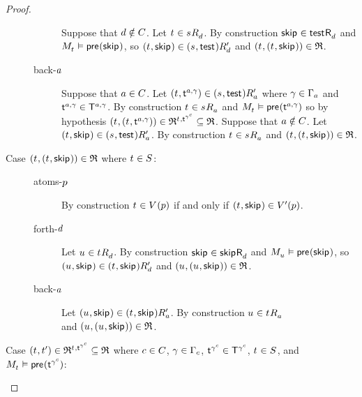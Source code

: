 \begin{proof}
\begin{description}
\begin{description}
                Suppose that $\agentD \notin \agentsC$.
                Let $\kStateT \in \kSuccessorsD{\kStateS}$.
                By construction $\aStateSkip \in \aSuccessorsD{\aStateTest}$ and $\kPModel{\kStateT} \entails \aPrecondition(\aStateSkip)$, so $(\kStateT, \aStateSkip) \in \kSuccessorsPD{(\kStateS, \aStateTest)}$ and $(\kStateT, (\kStateT, \aStateSkip)) \in \refinement$.
            \item[back-$\agentA$]
                Suppose that $\agentA \in \agentsC$.
                Let $(\kStateT, \aStateT[\agentA, \gamma]) \in \kSuccessorsPA{(\kStateS, \aStateTest)}$ where $\gamma \in \Gamma_\agentA$ and $\aStateT[\agentA, \gamma] \in \aStatesT[\agentA, \gamma]$.
                By construction $\kStateT \in \kSuccessorsA{\kStateS}$ and $\kPModel{\kStateT} \entails \aPrecondition(\aStateT[\agentA, \gamma])$ so by hypothesis $(\kStateT, (\kStateT, \aStateT[\agentA, \gamma])) \in \refinement^{\kStateT, \aStateT[\gamma^\agentC]} \subseteq \refinement$.
                Suppose that $\agentA \notin \agentsC$.
                Let $(\kStateT, \aStateSkip) \in \kSuccessorsPA{(\kStateS, \aStateTest)}$.
                By construction $\kStateT \in \kSuccessorsA{\kStateS}$ and $(\kStateT, (\kStateT, \aStateSkip)) \in \refinement$.
        \end{description}
    \item[{Case $(\kStateT, (\kStateT, \aStateSkip)) \in \refinement$ where $\kStateT \in \kStates$:}] \hfill
        \begin{description}
            \item[atoms-$\atomP$]
                By construction $\kStateT \in \kValuation(\atomP)$ if and only if $(\kStateT, \aStateSkip) \in \kValuationP(\atomP)$.
            \item[forth-$\agentD$]
                Let $\kStateU \in \kSuccessorsD{\kStateT}$.
                By construction $\aStateSkip \in \aSuccessorsD{\aStateSkip}$ and $\kPModel{\kStateU} \entails \aPrecondition(\aStateSkip)$, so $(\kStateU, \aStateSkip) \in \kSuccessorsPD{(\kStateT, \aStateSkip)}$ and $(\kStateU, (\kStateU, \aStateSkip)) \in \refinement$.
            \item[back-$\agentA$]
                Let $(\kStateU, \aStateSkip) \in \kSuccessorsPA{(\kStateT, \aStateSkip)}$.
                By construction $\kStateU \in \kSuccessorsA{\kStateT}$ \\and $(\kStateU, (\kStateU, \aStateSkip)) \in \refinement$.
        \end{description}
    \item[{Case $(\kStateT, \kStateTP) \in \refinement^{\kStateT, \aStateT[\gamma^\agentC]} \subseteq \refinement$ where $\agentC \in \agentsC$, $\gamma \in \Gamma_\agentC$, $\aStateT[\gamma^\agentC] \in \aStatesT[\gamma^\agentC]$, $\kStateT \in \kStates$, and $\kPModel{\kStateT} \entails \aPrecondition(\aStateT[\gamma^\agentC])$:}]\hfill

\end{description}
\end{proof}
